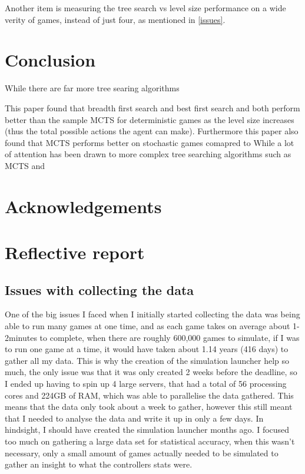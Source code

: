 \documentclass[journal]{IEEEtran}
\begin{document}
Another item is measuring the tree search vs level size performance on a wide verity of games, instead of just four, as mentioned in \ref{issues}.



\section{Conclusion}
While there are far more tree searing algorithms 

This paper found that breadth first search and best first search and both perform better than the sample MCTS for deterministic games as the level size increases (thus the total possible actions the agent can make). Furthermore this paper also found that MCTS performs better on stochastic games comapred to 
While a lot of attention has been drawn to more complex tree searching algorithms such as MCTS and 



	\appendices
		\section{Acknowledgements}

		\section{Reflective report}
		\subsection{Issues with collecting the data}
			One of the big issues I faced when I initially started collecting the data was being able to run many games at one time, and as each game takes on average about 1-2minutes to complete, when there are roughly 600,000 games to simulate, if I was to run one game at a time, it would have taken about 1.14 years (416 days) to gather all my data. This is why the creation of the simulation launcher help so much, the only issue was that it was only created 2 weeks before the deadline, so I ended up having to spin up 4 large servers, that had a total of 56 processing cores and 224GB of RAM, which was able to parallelise the data gathered. This means that the data only took about a week to gather, however this still meant that I needed to analyse the data and write it up in only a few days. In hindsight, I should have created the simulation launcher months ago.
			I focused too much on gathering  a large data set for statistical accuracy, when this wasn't necessary, only a small amount of games actually needed to be simulated to gather an insight to what the controllers stats were.
\end{document}
